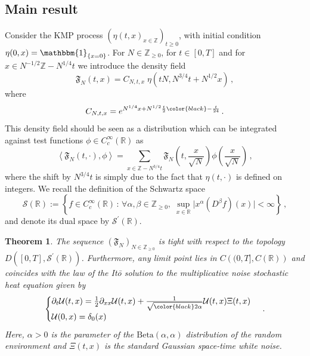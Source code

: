 \documentclass[a4paper,11pt,oneside,reqno]{amsart}
\newtheorem{theorem}{Theorem}[section]
\theoremstyle{definition}
\renewcommand{\geq}{\geqslant}
\numberwithin{equation}{section}
\begin{document}
\subsection{Main result}\label{section-MainResult}
Consider the KMP process $(\eta(t,x)_{x\in \mathbb{Z}})_{t\geq 0}$, with initial condition $\eta(0,x)=\mathbbm{1}_{\{x=0\}}$. For $N\in \mathbb{Z}_{\geq 0}$, for $t\in [0,T]$ 
and for $x\in N^{-1/2}\mathbb{Z}-N^{1/4}t$ we introduce the density field 
\begin{equation}\label{distribution-field}
\mathfrak{F}_{N}\left(t,x\right)=C_{N,t,x}\; \eta(t N, N^{3/4}t+N^{1/2}x)\,,
\end{equation}
where 
\begin{equation}\label{filed-explicit}
	C_{N,t,x}=e^{N^{1/4}x + N^{1/2}\frac{t}{2}{\color{black}-\frac{t}{24}}}\,.
\end{equation}
This density field should be seen as a distribution which can be  integrated against test functions $\phi\in C_{c}^{\infty}(\mathbb{R})$ as 
\begin{equation}\label{skorokhod-field}
	\left\langle \mathfrak{F}_{N}\left(t,\cdot\right),\phi\right\rangle =\sum_{x\in\mathbb{Z}-N^{3/4}t}\mathfrak{F}_{N}\left(t,\frac{x}{\sqrt N}\right)\phi\left(\frac{x}{\sqrt N}\right)\,, 
\end{equation}
where the shift by $N^{3/4}t$ is simply due to the fact that $\eta(t, \cdot)$ is defined on integers. 
We recall the definition of the Schwartz space 
\begin{equation*}
	\mathcal{S}(\mathbb{R}):=\left\{f\in C_{c}^{\infty}(\mathbb{R})\,:\,\forall \alpha,\beta\in \mathbb{Z}_{\geq 0},\; \sup_{x\in \mathbb{R}}\lvert x^{\alpha} (D^{\beta}f)(x)\rvert<\infty\right\}\,, 
\end{equation*}
and denote its dual space by $\mathcal{S}^{'}(\mathbb{R})$.
 \begin{theorem}\label{Thm-convergence}
The sequence  $(\mathfrak{F}_{N})_{N\in\mathbb{Z}_{\geq 0}}$ is tight with respect to the topology $D\left([0,T],\mathcal{S}^{'}(\mathbb{R})\right)$. Furthermore, any limit point lies in $C\left((0,T],C(\mathbb{R})\right)$ and coincides with the law of the It\=o solution to the multiplicative noise stochastic heat equation given by  
\begin{equation}\label{SHE}
	\begin{cases}
		\partial_{t}\mathcal{U}(t,x)=\frac{1}{2}\partial_{xx}\mathcal{U}(t,x)+\frac{1}{\sqrt{{\color{black}2}\alpha}}\mathcal{U}(t,x)\Xi(t,x)\\
		\mathcal{U}(0,x)=\delta_{0}(x)
	\end{cases}\,.
\end{equation}
Here, $\alpha>0$ is the parameter of the $\text{Beta}(\alpha,\alpha)$ distribution of the random environment and $\Xi(t,x)$ is the standard Gaussian space-time white noise.  
\end{theorem}
\end{document}
